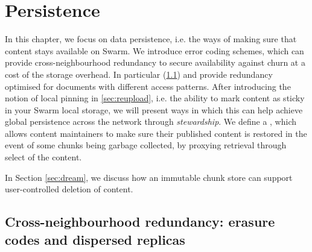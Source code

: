 \chapter{Persistence \statusgreen}\label{sec:persistence}


In this chapter, we focus on data persistence, i.e. the ways of making sure that content stays available on Swarm. 
We introduce error coding schemes, which can provide cross-neighbourhood redundancy to secure availability against churn at a cost of the storage overhead. 
In particular  (\ref{sec:erasure}) and   %
provide redundancy optimised for documents with different access patterns.
After introducing the notion of local pinning in \ref{sec:reupload}, i.e. the ability to mark content as sticky in your Swarm local storage, we will present ways in which this can help achieve global persistence across the network through \emph{stewardship}. We define a , which allows content maintainers to make sure their published content is restored in the event of some chunks being garbage collected, by proxying retrieval through select  of the content.

In Section \ref{sec:dream}, we discuss how an immutable chunk store can support user-controlled deletion of content.





\section{Cross-neighbourhood redundancy: erasure codes and dispersed replicas \statusgreen}\label{sec:erasure}
\green{}

